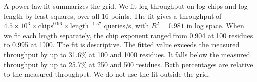A power-law fit summarizes the grid. We fit log throughput on log chips and log length by least squares, over all 16 points. %
The fit gives a throughput of $4.5 \times 10^{3} \times \mathrm{chips}^{0.96} \times \mathrm{length}^{-1.57}$ queries/s, with $R^2 = 0.981$ in log space. %
When we fit each length separately, the chip exponent ranged from 0.904 at 100 residues to 0.995 at 1000. %
The fit is descriptive. The fitted value exceeds the measured throughput by up to 31.6\% at 100 and 1000 residues. %
It falls below the measured throughput by up to 25.7\% at 250 and 500 residues. Both percentages are relative to the measured throughput. %
We do not use the fit outside the grid.

